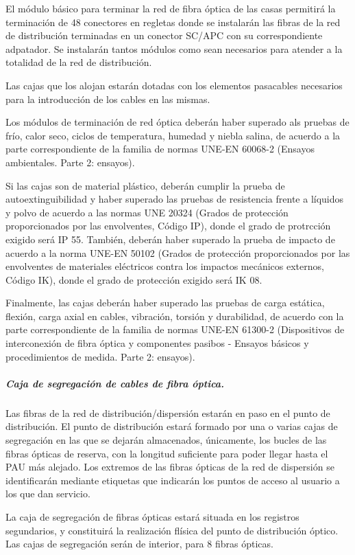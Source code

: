 El módulo básico para terminar la red de fibra óptica de las casas permitirá la terminación de 48 conectores en regletas donde se instalarán las fibras de la red de distribución terminadas en un conector SC/APC con su correspondiente adpatador. Se instalarán tantos módulos como sean necesarios para atender a la totalidad de la red de distribución.

Las cajas que los alojan estarán dotadas con los elementos pasacables necesarios para la introducción de los cables en las mismas.

Los módulos de terminación de red óptica deberán haber superado als pruebas de frío, calor seco, ciclos de temperatura, humedad y niebla salina, de acuerdo a la parte correspondiente de la familia de normas UNE-EN 60068-2 (Ensayos ambientales. Parte 2: ensayos).

Si las cajas son de material plástico, deberán cumplir la prueba de autoextinguibilidad y haber superado las pruebas de resistencia frente a líquidos y polvo de acuerdo a las normas UNE 20324 (Grados de protección proporcionados por las envolventes, Código IP), donde el grado de protrcción exigido será IP 55. También, deberán haber superado la prueba de impacto de acuerdo a la norma UNE-EN 50102 (Grados de protección proporcionados por las envolventes de materiales eléctricos contra los impactos mecánicos externos, Código IK), donde el grado de protección exigido será IK 08.

Finalmente, las cajas deberán haber superado las pruebas de carga estática, flexión, carga axial en cables, vibración, torsión y durabilidad, de acuerdo con la parte correspondiente de la familia de normas UNE-EN 61300-2 (Dispositivos de interconexión de fibra óptica y componentes pasibos - Ensayos básicos y procedimientos de medida. Parte 2: ensayos).

\subparagraph{Caja de segregación de cables de fibra óptica.}
Las fibras de la red de distribución/dispersión estarán en paso en el punto de distribución. El punto de distribución estará formado por una o varias cajas de segregación en las que se dejarán almacenados, únicamente, los bucles de las fibras ópticas de reserva, con la longitud suficiente para poder llegar hasta el PAU más alejado. Los extremos de las fibras ópticas de la red de dispersión se identificarán mediante etiquetas que indicarán los puntos de acceso al usuario a los que dan servicio.

La caja de segregación de fibras ópticas estará situada en los registros segundarios, y constituirá la realización flísica del punto de distribución óptico. Las cajas de segregación serán de interior, para 8 fibras ópticas.

